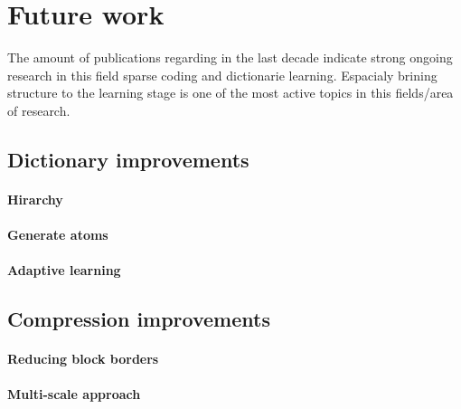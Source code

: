 \section{Future work}
The amount of publications regarding in
the last decade indicate strong ongoing research in this field sparse coding and
dictionarie learning. Espacialy brining structure to the learning stage is one
of the most active topics in this fields/area of research. 

\subsection{Dictionary improvements}
\paragraph{Hirarchy}
\paragraph{Generate atoms}
\paragraph{Adaptive learning}

\subsection{Compression improvements}
\paragraph{Reducing block borders}
\paragraph{Multi-scale approach}

